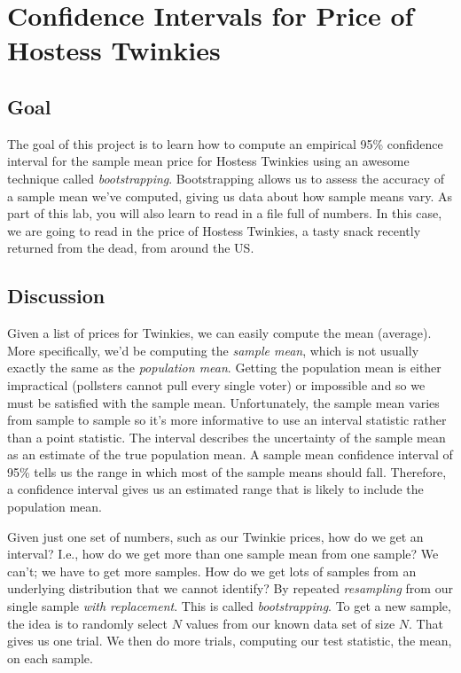 \documentclass[titlepage]{tufte-book}
\newcounter{problem}
\begin{document}
\chapter{Confidence Intervals for Price of Hostess Twinkies}

\setcounter{problem}{1}
\section{Goal}

\begin{fullwidth}

The goal of this project is to learn how to compute an empirical 95\% confidence interval for the sample mean price for Hostess Twinkies using an awesome technique called {\em bootstrapping}. Bootstrapping allows us to assess the accuracy of a sample mean we've computed, giving us data about how sample means vary. As part of this lab, you will also learn to read in a file full of numbers. In this case, we are going to read in the price of Hostess Twinkies, a tasty snack recently returned from the dead, from around the US.

\section{Discussion}

Given a list of prices for Twinkies, we can easily compute the mean (average). More specifically, we'd be computing the {\em sample mean}, which is not usually exactly the same as the {\em population mean}. Getting the population mean is either impractical (pollsters cannot pull every single voter) or impossible and so we must be satisfied with the sample mean.   Unfortunately, the sample mean varies from sample to sample so it's more informative to use an interval statistic rather than a point statistic. The interval describes the uncertainty of the sample mean as an estimate of the true population mean.  A sample mean confidence interval of 95\% tells us the range in which most of the sample means should fall. Therefore, a confidence interval gives us an estimated range that is likely to include the population mean.

Given just one set of numbers, such as our Twinkie prices, how do we get an interval? I.e., how do we get more than one sample mean from one sample?  We can't; we have to get more samples.  How do we get lots of samples from an underlying distribution that we cannot identify? By repeated {\em resampling} from our single sample {\em with replacement}. This is called {\em bootstrapping}. To get a new sample, the idea is to randomly select $N$ values from our known data set of size $N$. That gives us one trial. We then do more trials, computing our test statistic, the mean, on each sample.


\end{fullwidth}
\end{document}
